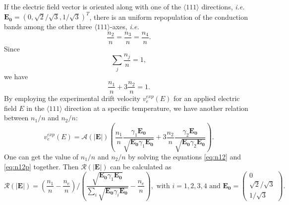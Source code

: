 If the electric field vector is oriented along with one of the $\langle111\rangle$ directions, \textit{i.e.} $\mathbf{E_{0}} = (0,\sqrt{2}/\sqrt{3},1/\sqrt{3})^{T}$, there is an uniform repopulation of the conduction bands among the other three $\langle111\rangle$-axes, \textit{i.e.}
\begin{equation}
  \label{eq:n111}
  \frac{n_{2}}{n} = \frac{n_{3}}{n} = \frac{n_{4}}{n}.
\end{equation}
Since
\begin{equation}
  \label{eq:nsum}
  \displaystyle \sum_{j}\frac{n_{j}}{n} = 1,
\end{equation}
we have
\begin{equation}
  \label{eq:n12}
  \frac{n_{1}}{n} + 3\frac{n_{2}}{n}= 1.
\end{equation}
By employing the experimental drift velocity $v_{e}^{exp}(E)$ for an applied electric field $E$ in the $\langle111\rangle$ direction at a specific temperature, we have another relation between $n_{1}/n$ and $n_{2}/n$:
\begin{equation}
  \label{eq:n12p}
  v_{e}^{exp}(E) =  \mathcal{A}(|\mathbf{E}|) \left(  \frac{n_{1}}{n} \frac{\gamma_{1}\mathbf{E_{0}}}         {\sqrt{\mathbf{E_{0}}\gamma_{1}\mathbf{E_{0}}}} +  3\frac{n_{2}}{n} \frac{\gamma_{2}\mathbf{E_{0}}}         {\sqrt{\mathbf{E_{0}}\gamma_{2}\mathbf{E_{0}}}} \right).
\end{equation}
One can get the value of $n_{1}/n$ and $n_{2}/n$ by solving the equations \ref{eq:n12} and \ref{eq:n12p} together. Then $\mathcal{R}(|\mathbf{E}|)$ can be calculated as
\begin{equation}
  \label{eq:re}
  \mathcal{R(|\mathbf{E}|)} = \left( \frac{n_{1}}{n} - \frac{n_{e}}{n}     \right) / \left(     \frac{\sqrt{\mathbf{E_{0}}\gamma_{1}\mathbf{E_{0}}}}
    {\sum_{i}\sqrt{\mathbf{E_{0}}\gamma_{i}\mathbf{E_{0}}}} -                           \frac{n_{e}}{n} \right),  \mbox{ with }           i=1,2,3,4 \mbox{ and       } \mathbf{E_{0}} = \left( \begin{array}{c} 
      0\\ \sqrt{2}/\sqrt{3}\\1/\sqrt{3} \end{array} \right).
\end{equation}

